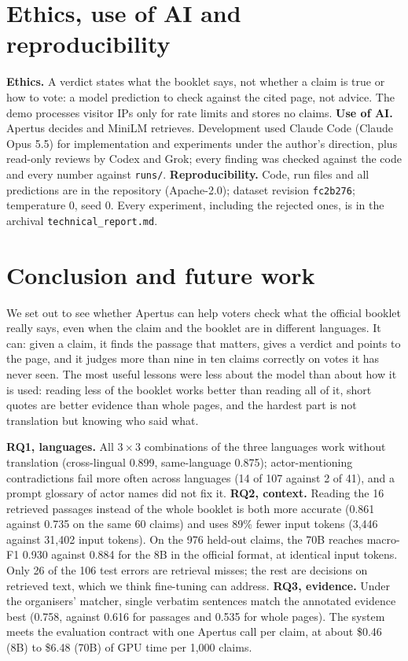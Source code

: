 \documentclass[10pt,a4paper]{article}
\begin{document}
\section{Ethics, use of AI and reproducibility}
\textbf{Ethics.} A verdict states what the booklet says, not whether a claim is true or how to vote:
a model prediction to check against the cited page, not advice. The demo processes visitor IPs only for
rate limits and stores no claims.
\textbf{Use of AI.} Apertus decides and MiniLM retrieves. Development used Claude Code (Claude Opus
5.5) for implementation and experiments under the author's direction, plus read-only reviews by Codex
and Grok; every finding was checked against the code and every number against \texttt{runs/}.
\textbf{Reproducibility.} Code, run files and all predictions are in the repository (Apache-2.0);
dataset revision \texttt{fc2b276}; temperature 0, seed 0. Every experiment, including the rejected ones, is in the archival \texttt{technical\_report.md}.

\section{Conclusion and future work}\label{sec:future}
We set out to see whether Apertus can help voters check what the official booklet really says, even
when the claim and the booklet are in different languages. It can: given a claim, it finds the passage
that matters, gives a verdict and points to the page, and it judges more than nine in ten claims correctly on
votes it has never seen. The most useful lessons were less about the model than about how it is used:
reading less of the booklet works better than reading all of it, short quotes are better evidence than
whole pages, and the hardest part is not translation but knowing who said what.

\textbf{RQ1, languages.} All $3\times3$ combinations of the three languages work without translation (cross-lingual 0.899,
same-language 0.875); actor-mentioning contradictions fail more often across languages (14 of 107
against 2 of 41), and a prompt glossary of actor names did not fix it.
\textbf{RQ2, context.} Reading the 16 retrieved passages instead of the whole booklet is both more
accurate (0.861 against 0.735 on the same 60 claims) and uses 89\% fewer input tokens (3{,}446 against 31{,}402
input tokens). On the 976 held-out claims, the 70B reaches macro-F1 0.930 against 0.884 for the 8B in the
official format, at identical input tokens. Only 26 of the 106 test errors are retrieval misses; the rest are decisions on retrieved text,
which we think fine-tuning can address.
\textbf{RQ3, evidence.} Under the organisers' matcher, single verbatim sentences match the annotated
evidence best (0.758, against 0.616 for passages and 0.535 for whole pages).
The system meets the evaluation contract with one Apertus call per claim, at about \$0.46 (8B) to
\$6.48 (70B) of GPU time per 1{,}000 claims.
\end{document}
